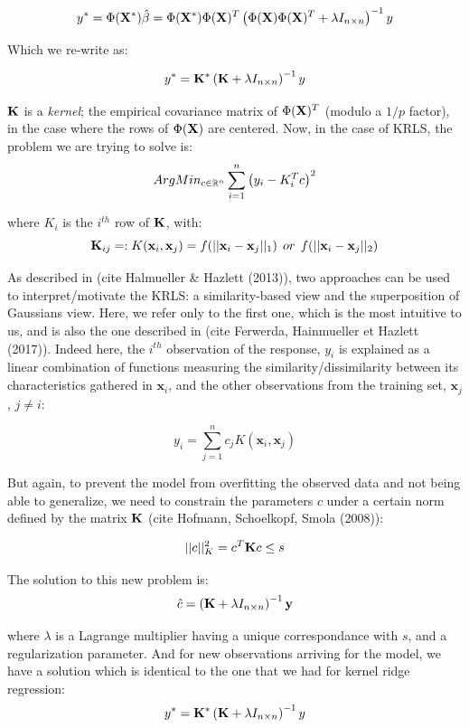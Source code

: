 $$
y^* = \Phi({\bf X^*})\hat{\beta} = \Phi({\bf X^*})\Phi({\bf X})^T \left( \Phi({\bf X})\Phi({\bf X})^T + \lambda I_{n \times n} \right)^{-1} y
$$

Which we re-write as:

$$
y^* =  {\bf K^*} \left( {\bf K} + \lambda I_{n \times n} \right)^{-1} y
$$

${\bf K}$ is a {\it kernel}; the empirical covariance matrix of $\Phi({\bf X})^T$ (modulo a $1/p$ factor), in the case where the rows of $\Phi({\bf X})$ are centered. Now, in the case of KRLS, the problem we are trying to solve is:
$$
ArgMin_{c \in \mathbb{R}^n} \sum_{i = 1}^n \left( y_i - K_i^T c \right)^2
$$

where $K_i$ is the $i^{th}$ row of ${\bf K}$, with:
$$
{\bf K}_{ij} =: K(\textbf{x}_i, \textbf{x}_j) = f(||\textbf{x}_i - \textbf{x}_j||_1) \: \: or \: \: f(||\textbf{x}_i - \textbf{x}_j||_2)
$$

As described in (cite Halmueller \& Hazlett (2013)), two approaches can be used to interpret/motivate the KRLS: a similarity-based view and the superposition of Gaussians view. Here, we refer only to the first one, which is the most intuitive to us, and is also the one described in (cite Ferwerda, Hainmueller et Hazlett (2017)). Indeed here, the $i^{th}$ observation of the response, $y_i$ is explained as a linear combination of functions measuring the similarity/dissimilarity between its characteristics gathered in $\textbf{x}_i$, and the other observations from the training set, $\textbf{x}_j$, $j \neq i$:

\begin{equation}
\label{eq:comblinresponse}
y_i = \sum_{j = 1}^n c_j K(\textbf{x}_i, \textbf{x}_j)
\end{equation}

But again, to prevent the model from overfitting the observed data and not being able to generalize, we need to constrain the parameters $c$ under a certain norm defined by the matrix ${\bf K}$ (cite Hofmann, Schoelkopf, Smola (2008)):

$$
||c||^2_K = c^T {\bf K}  c  \leq s
$$

The solution to this new problem is:
$$
\hat{c} = \left( {\bf K}  + \lambda I_{n \times n} \right)^{-1}{\bf y}\\
$$

where $\lambda$ is a Lagrange multiplier having a unique correspondance with $s$, and a regularization parameter. And for new observations arriving for the model, we have a solution which is identical to the one that we had for kernel ridge regression:
$$
y^* =  {\bf K^*} \left( {\bf K} + \lambda I_{n \times n} \right)^{-1} y
$$


